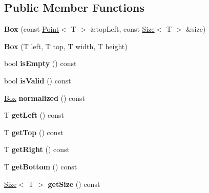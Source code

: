 \subsection*{Public Member Functions}
\begin{DoxyCompactItemize}
\item 
\hypertarget{class_box_ad8f5cd82926a0d9249167b4c1e4be4cc}{
{\bfseries Box} (const \hyperlink{class_point}{Point}$<$ T $>$ \&topLeft, const \hyperlink{class_size}{Size}$<$ T $>$ \&size)}
\label{class_box_ad8f5cd82926a0d9249167b4c1e4be4cc}

\item 
\hypertarget{class_box_adacfc3678389e68945da2976da8693ec}{
{\bfseries Box} (T left, T top, T width, T height)}
\label{class_box_adacfc3678389e68945da2976da8693ec}

\item 
\hypertarget{class_box_ae312de0c0f0bc30588cf928c8ea648d1}{
bool {\bfseries isEmpty} () const }
\label{class_box_ae312de0c0f0bc30588cf928c8ea648d1}

\item 
\hypertarget{class_box_abe6f8df2b637e9b16d4ee3e7a7d17d2b}{
bool {\bfseries isValid} () const }
\label{class_box_abe6f8df2b637e9b16d4ee3e7a7d17d2b}

\item 
\hypertarget{class_box_a817dc7dc90d3b2b8233630a3a8ffbd4d}{
\hyperlink{class_box}{Box} {\bfseries normalized} () const }
\label{class_box_a817dc7dc90d3b2b8233630a3a8ffbd4d}

\item 
\hypertarget{class_box_aed2302c4897867af461de311c6e42c25}{
T {\bfseries getLeft} () const }
\label{class_box_aed2302c4897867af461de311c6e42c25}

\item 
\hypertarget{class_box_a4f48783c0481ebf5790c2b72d6e1a450}{
T {\bfseries getTop} () const }
\label{class_box_a4f48783c0481ebf5790c2b72d6e1a450}

\item 
\hypertarget{class_box_af1d21fffce6496b0fdbdda6daeb0b208}{
T {\bfseries getRight} () const }
\label{class_box_af1d21fffce6496b0fdbdda6daeb0b208}

\item 
\hypertarget{class_box_ad58e804875cef692c723e34439c721ee}{
T {\bfseries getBottom} () const }
\label{class_box_ad58e804875cef692c723e34439c721ee}

\item 
\hypertarget{class_box_a57244f0456fc3e588d37a5a59784d154}{
\hyperlink{class_size}{Size}$<$ T $>$ {\bfseries getSize} () const }
\label{class_box_a57244f0456fc3e588d37a5a59784d154}


\end{DoxyCompactItemize}
